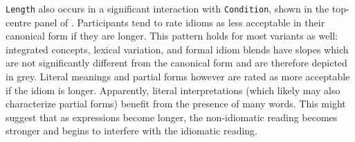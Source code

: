 \documentclass[output=paper,modfonts,nonflat]{langsci/langscibook}
\begin{document}
\texttt{Length} also occurs in a significant interaction with \texttt{Condition}, shown in the top-centre panel of . Participants tend to rate idioms as less acceptable in their canonical form if they are longer. This pattern holds for most variants as well: integrated concepts, lexical variation, and formal idiom blends have slopes which are not significantly different from the canonical form and are therefore depicted in grey. Literal meanings and partial forms however are rated as more acceptable if the idiom is longer. Apparently, literal interpretations (which likely may also characterize partial forms) benefit from the presence of many words. This might suggest that as expressions become longer, the non-idiomatic reading becomes stronger and begins to interfere with the idiomatic reading.\\
\end{document}
